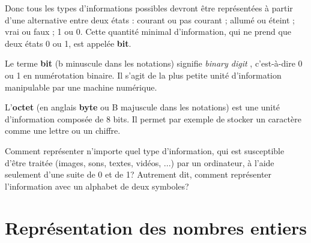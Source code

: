 Donc tous les types d’informations possibles devront être représentées à partir d’une alternative entre deux états : courant ou pas courant ; allumé ou éteint ; vrai ou faux ; 1 ou 0. Cette quantité minimal d'information, qui ne prend que deux états 0 ou 1, est appelée \textbf{bit}.

\begin{mydefinition}
	Le terme {\bf bit} (b minuscule dans les notations) signifie {\it binary digit }, c'est-à-dire 0 ou 1 en numérotation binaire. Il s'agit de la plus petite unité d'information manipulable par une machine numérique. 
	\vspace{0.2cm}
	
	L'{\bf octet} (en anglais {\bf byte} ou B majuscule dans les notations) est une unité d'information composée de 8 bits. Il permet par exemple de stocker un caractère comme une lettre ou un chiffre.
\end{mydefinition}


\begin{question}
	Comment représenter n'importe quel type d'information, qui est susceptible d'être traitée (images, sons, textes, vidéos, ...) par un ordinateur, à l'aide seulement d'une suite de 0 et de 1? Autrement dit, comment représenter l'information avec un alphabet de deux symboles?
\end{question}


\section{Représentation des nombres entiers}
